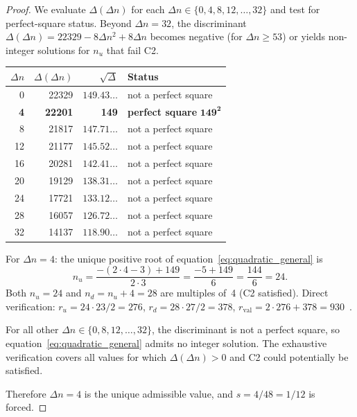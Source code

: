 \documentclass[12pt,a4paper]{article}
\newcommand{\nuu}{n_u}
\newcommand{\ndd}{n_d}
\newcommand{\Dn}{\Delta n}
\newcommand{\rval}{r_{\mathrm{val}}}
\begin{document}
\begin{proof}
We evaluate $\Delta(\Dn)$ for each $\Dn \in \{0, 4, 8, 12, \ldots, 32\}$ and test for perfect-square status. Beyond $\Dn = 32$, the discriminant $\Delta(\Dn) = 22329 - 8\Dn^2 + 8\Dn$ becomes negative (for $\Dn \geq 53$) or yields non-integer solutions for $\nuu$ that fail C2.

\medskip
\begin{center}
\begin{tabular}{rrrl}
\toprule
$\Dn$ & $\Delta(\Dn)$ & $\sqrt{\Delta}$ & Status \\
\midrule
0 & 22329 & $149.43\ldots$ & not a perfect square \\
\textbf{4} & \textbf{22201} & \textbf{149} & \textbf{perfect square} $\boldsymbol{149^2}$ \\
8 & 21817 & $147.71\ldots$ & not a perfect square \\
12 & 21177 & $145.52\ldots$ & not a perfect square \\
16 & 20281 & $142.41\ldots$ & not a perfect square \\
20 & 19129 & $138.31\ldots$ & not a perfect square \\
24 & 17721 & $133.12\ldots$ & not a perfect square \\
28 & 16057 & $126.72\ldots$ & not a perfect square \\
32 & 14137 & $118.90\ldots$ & not a perfect square \\
\bottomrule
\end{tabular}
\end{center}

\medskip For $\Dn = 4$: the unique positive root of equation~\eqref{eq:quadratic_general} is
\begin{equation}
\nuu = \frac{-(2\cdot4-3) + 149}{2\cdot3} = \frac{-5 + 149}{6} = \frac{144}{6} = 24.
\end{equation}
Both $\nuu = 24$ and $\ndd = \nuu + 4 = 28$ are multiples of~4 (C2 satisfied). Direct verification: $r_u = 24\cdot23/2 = 276$, $r_d = 28\cdot27/2 = 378$, $\rval = 2\cdot276 + 378 = 930$~\checkmark.

For all other $\Dn \in \{0, 8, 12, \ldots, 32\}$, the discriminant is not a perfect square, so equation~\eqref{eq:quadratic_general} admits no integer solution. The exhaustive verification covers all values for which $\Delta(\Dn) > 0$ and C2 could potentially be satisfied.

Therefore $\Dn = 4$ is the unique admissible value, and $s = 4/48 = 1/12$ is forced.
\end{proof}
\end{document}
